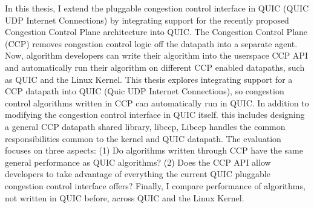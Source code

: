 %
%
%
In this thesis, I extend the pluggable congestion control interface in QUIC (QUIC UDP Internet Connections) by integrating support for the recently proposed Congestion Control Plane architecture into QUIC.
The Congestion Control Plane (CCP) removes congestion control logic off the datapath into a separate agent.
Now, algorithm developers can write their algorithm into the userspace CCP API and automatically run their algorithm on different CCP enabled datapaths, such as QUIC and the Linux Kernel.
This thesis explores integrating support for a CCP datapath into QUIC (Quic UDP Internet Connections), so congestion control algorithms written in CCP can automatically run in QUIC.
In addition to modifying the congestion control interface in QUIC itself. this includes designing a general CCP datapath shared library, libccp, Libccp handles the common responsibilities common to the kernel and QUIC datapath.
The evaluation focuses on three aspects: (1) Do algorithms written through CCP have the same general performance as QUIC algorithms?
(2) Does the CCP API allow developers to take advantage of everything the current QUIC pluggable congestion control interface offers?
Finally, I compare performance of algorithms, not written in QUIC before, across QUIC and the Linux Kernel.
